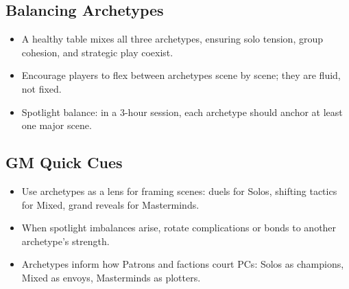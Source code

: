 \subsection{Balancing Archetypes}

\begin{itemize}
  \item A healthy table mixes all three archetypes, ensuring solo tension, group cohesion, and strategic play coexist.
  \item Encourage players to flex between archetypes scene by scene; they are fluid, not fixed.
  \item Spotlight balance: in a 3-hour session, each archetype should anchor at least one major scene.
\end{itemize}

\subsection{GM Quick Cues}

\begin{itemize}
  \item Use archetypes as a lens for framing scenes: duels for Solos, shifting tactics for Mixed, grand reveals for Masterminds.
  \item When spotlight imbalances arise, rotate complications or bonds to another archetype's strength.
  \item Archetypes inform how Patrons and factions court PCs: Solos as champions, Mixed as envoys, Masterminds as plotters.
\end{itemize}

